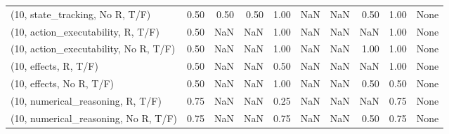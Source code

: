 \begin{table*}[h!]
\begin{adjustbox}{width=2\columnwidth,center}
\begin{tabular}{lrrr|rrr|rrr}
(10, state\_tracking, No R, T/F)       &                      0.50 &                  0.50 &                      0.50 &                          1.00 &                       NaN &                           NaN &                                   0.50 &                               1.00 &                                  None \\
(10, action\_executability, R, T/F)    &                      0.50 &                   NaN &                       NaN &                          1.00 &                       NaN &                           NaN &                                    NaN &                               1.00 &                                  None \\
(10, action\_executability, No R, T/F) &                      0.50 &                   NaN &                       NaN &                          1.00 &                       NaN &                           NaN &                                   1.00 &                               1.00 &                                  None \\
(10, effects, R, T/F)                 &                      0.50 &                   NaN &                       NaN &                          0.50 &                       NaN &                           NaN &                                    NaN &                               1.00 &                                  None \\
(10, effects, No R, T/F)              &                      0.50 &                   NaN &                       NaN &                          1.00 &                       NaN &                           NaN &                                   0.50 &                               0.50 &                                  None \\
(10, numerical\_reasoning, R, T/F)     &                      0.75 &                   NaN &                       NaN &                          0.25 &                       NaN &                           NaN &                                    NaN &                               0.75 &                                  None \\
(10, numerical\_reasoning, No R, T/F)  &                      0.75 &                   NaN &                       NaN &                          0.75 &                       NaN &                           NaN &                                   0.50 &                               0.75 &                                  None \\

\end{tabular}
\end{adjustbox}
\end{table*}
